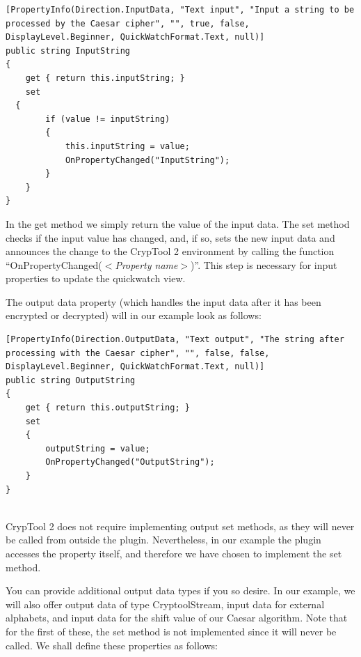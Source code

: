 \begin{lstlisting}
[PropertyInfo(Direction.InputData, "Text input", "Input a string to be processed by the Caesar cipher", "", true, false, DisplayLevel.Beginner, QuickWatchFormat.Text, null)]
public string InputString
{
	get { return this.inputString; }
	set
  {
		if (value != inputString)
		{
			this.inputString = value;
			OnPropertyChanged("InputString");
		}
	}
}
\end{lstlisting}

In the get method we simply return the value of the input data. The set method checks if the input value has changed, and, if so, sets the new input data and announces the change to the CrypTool 2 environment by calling the function ``OnPropertyChanged(\textit{$<$Property name$>$})''. This step is necessary for input properties to update the quickwatch view.
\clearpage


The output data property (which handles the input data after it has been encrypted or decrypted) will in our example look as follows:

\begin{lstlisting}
[PropertyInfo(Direction.OutputData, "Text output", "The string after processing with the Caesar cipher", "", false, false, DisplayLevel.Beginner, QuickWatchFormat.Text, null)]
public string OutputString
{
	get { return this.outputString; }
	set
	{
		outputString = value;
		OnPropertyChanged("OutputString");
	}
}
\end{lstlisting}

\ \\
\indent CrypTool 2 does not require implementing output set methods, as they will never be called from outside the plugin. Nevertheless, in our example the plugin accesses the property itself, and therefore we have chosen to implement the set method.

You can provide additional output data types if you so desire. In our example, we will also offer output data of type CryptoolStream, input data for external alphabets, and input data for the shift value of our Caesar algorithm. Note that for the first of these, the set method is not implemented since it will never be called. We shall define these properties as follows:


